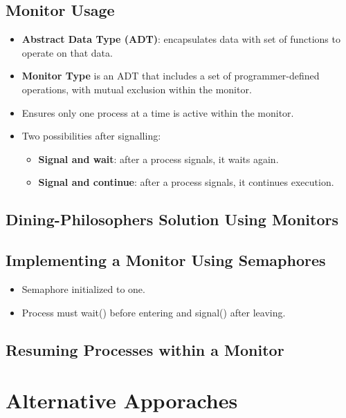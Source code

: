 \documentclass[10pt]{report}
\begin{document}
		\subsection{Monitor Usage}
			\begin{itemize}
				\item \textbf{Abstract Data Type (ADT)}: encapsulates data with set of functions to operate on that data.
				\item \textbf{Monitor Type} is an ADT that includes a set of programmer-defined operations, with mutual exclusion within the monitor.
				\item Ensures only one process at a time is active within the monitor.
				\item Two possibilities after signalling:
				\begin{itemize}
					\item \textbf{Signal and wait}: after a process signals, it waits again.
					\item \textbf{Signal and continue}: after a process signals, it continues execution.
				\end{itemize}
			\end{itemize}

		\subsection{Dining-Philosophers Solution Using Monitors}

		\subsection{Implementing a Monitor Using Semaphores}
			\begin{itemize}
				\item Semaphore initialized to one.
				\item Process must wait() before entering and signal() after leaving.
			\end{itemize}

		\subsection{Resuming Processes within a Monitor}


	\section{Alternative Apporaches}
\end{document}
